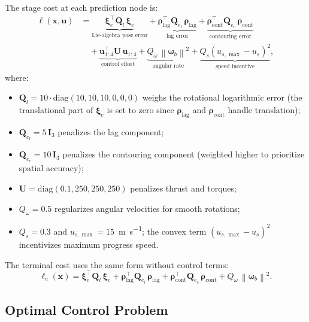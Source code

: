 \documentclass[journal]{IEEEtran}
\newcommand{\norm}[1]{\left\| #1 \right\|}
\begin{document}
The stage cost at each prediction node is:
\begin{equation}
\boxed{
\begin{aligned}
    \ell(\bm{x}, \bm{u}) &= \underbrace{\bm{\xi}_e^\top \bm{Q}_l\, \bm{\xi}_e}_{\text{Lie-algebra pose error}} + \underbrace{\bm{\rho}_{\text{lag}}^\top \bm{Q}_{e_l}\, \bm{\rho}_{\text{lag}}}_{\text{lag error}} + \underbrace{\bm{\rho}_{\text{cont}}^\top \bm{Q}_{e_c}\, \bm{\rho}_{\text{cont}}}_{\text{contouring error}} \\
    &\quad + \underbrace{\bm{u}_{1:4}^\top \bm{U}\, \bm{u}_{1:4}}_{\text{control effort}} + \underbrace{Q_\omega\, \norm{\bm{\omega}_b}^2}_{\text{angular rate}} + \underbrace{Q_s\left(u_{s,\max} - u_s\right)^2}_{\text{speed incentive}},
\end{aligned}
}
\label{eq:cost}
\end{equation}
where:
\begin{itemize}
    \item $\bm{Q}_l = 10\cdot\text{diag}(10, 10, 10, 0, 0, 0)$ weighs the rotational logarithmic error (the translational part of $\bm{\xi}_e$ is set to zero since $\bm{\rho}_{\text{lag}}$ and $\bm{\rho}_{\text{cont}}$ handle translation);
    \item $\bm{Q}_{e_l} = 5\,\bm{I}_3$ penalizes the lag component;
    \item $\bm{Q}_{e_c} = 10\,\bm{I}_3$ penalizes the contouring component (weighted higher to prioritize spatial accuracy);
    \item $\bm{U} = \text{diag}(0.1, 250, 250, 250)$ penalizes thrust and torques;
    \item $Q_\omega = 0.5$ regularizes angular velocities for smooth rotations;
    \item $Q_s = 0.3$ and $u_{s,\max} = 15$~\si{\meter\per\second}; the convex term $(u_{s,\max} - u_s)^2$ incentivizes maximum progress speed.
\end{itemize}

The terminal cost uses the same form without control terms:
\begin{equation}
    \ell_e(\bm{x}) = \bm{\xi}_e^\top \bm{Q}_l\, \bm{\xi}_e + \bm{\rho}_{\text{lag}}^\top \bm{Q}_{e_l}\, \bm{\rho}_{\text{lag}} + \bm{\rho}_{\text{cont}}^\top \bm{Q}_{e_c}\, \bm{\rho}_{\text{cont}} + Q_\omega\, \norm{\bm{\omega}_b}^2.
    \label{eq:terminal_cost}
\end{equation}

\subsection{Optimal Control Problem}
\end{document}
